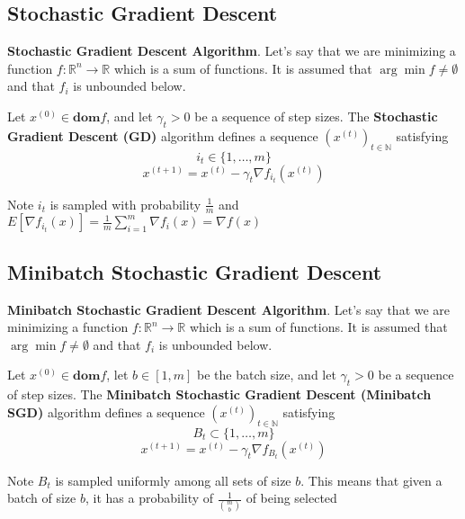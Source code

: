 \subsection{Stochastic Gradient Descent}
\noindent \textbf{Stochastic Gradient Descent Algorithm}. Let's say that we are minimizing a function $f: \mathbb{R}^n \rightarrow \mathbb{R}$ which is a sum of functions. It is assumed that $\arg \min f \neq \emptyset$ and that $f_i$ is unbounded below.  

\noindent Let $x^{(0)} \in \textbf{dom} f$, and let $\gamma_t > 0$ be a sequence of step sizes. The \textbf{Stochastic Gradient Descent (GD)} algorithm defines a sequence $(x^{(t)})_{t \in \mathbb{N}}$ satisfying 
\begin{equation}
    i_t \in \{1, \dots, m\}
\end{equation}
\begin{equation}
    x^{(t + 1)}  = x^{(t)} - \gamma_t \nabla f_{i_t}(x^{(t)})
\end{equation}

\noindent Note $i_t$ is sampled with probability $\frac{1}{m}$ and $E[\nabla f_{i_t}(x)] = \frac{1}{m} \sum_{i=1}^{m} \nabla f_i(x) = \nabla f(x)$

\subsection{Minibatch Stochastic Gradient Descent}
\noindent \textbf{Minibatch Stochastic Gradient Descent Algorithm}. Let's say that we are minimizing a function $f: \mathbb{R}^n \rightarrow \mathbb{R}$ which is a sum of functions. It is assumed that $\arg \min f \neq \emptyset$ and that $f_i$ is unbounded below.  

\noindent Let $x^{(0)} \in \textbf{dom} f$, let $b \in [1, m]$ be the batch size, and let $\gamma_t > 0$ be a sequence of step sizes. The \textbf{Minibatch Stochastic Gradient Descent (Minibatch SGD)} algorithm defines a sequence $(x^{(t)})_{t \in \mathbb{N}}$ satisfying 
\begin{equation}
    B_t \subset \{1, \dots, m\}
\end{equation}
\begin{equation}
    x^{(t + 1)}  = x^{(t)} - \gamma_t \nabla f_{B_t}(x^{(t)})
\end{equation}

\noindent Note $B_t$ is sampled uniformly among all sets of size $b$. This means that given a batch of size $b$, it has a probability of $\frac{1}{\binom{m}{b}}$ of being selected 

